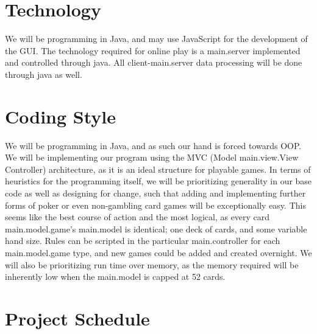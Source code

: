 \documentclass{article}
\begin{document}
\section{Technology}

We will be programming in Java, and may use JavaScript for the development of the GUI. The technology required for online play is a main.server implemented and controlled through java. All client-main.server data processing will be done through java as well.


\section{Coding Style}

We will be programming in Java, and as such our hand is forced towards OOP. We will be implementing our program using the MVC (Model main.view.View Controller) architecture, as it is an ideal structure for playable games. In terms of heuristics for the programming itself, we will be prioritizing generality in our base code as well as designing for change, such that adding and implementing further forms of poker or even non-gambling card games will be exceptionally easy. This seems like the best course of action and the most logical, as every card main.model.game's main.model is identical; one deck of cards, and some variable hand size. Rules can be scripted in the particular main.controller for each main.model.game type, and new games could be added and created overnight. We will also be prioritizing run time over memory, as the memory required will be inherently low when the main.model is capped at 52 cards.

\section{Project Schedule}


\end{document}
